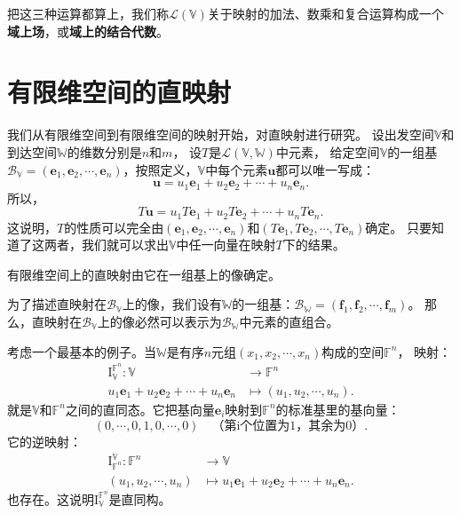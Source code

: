 \documentclass[12pt,UTF8,fontset=none]{ctexbook}
\begin{document}
把这三种运算都算上，我们称$\mathcal{L}(\mathbb{V})$关于映射的加法、数乘和复合运算构成一个\textbf{域上场}，或\textbf{域上的结合代数}。

\section{有限维空间的直映射}
我们从有限维空间到有限维空间的映射开始，对直映射进行研究。
设出发空间$\mathbb{V}$和到达空间$\mathbb{W}$的维数分别是$n$和$m$，
设$T$是$\mathcal{L}(\mathbb{V}, \mathbb{W})$中元素，
给定空间$\mathbb{V}$的一组基$\mathcal{B}_{\mathbb{V}} = (\mathbf{e}_1,\mathbf{e}_2,\cdots,\mathbf{e}_n)$，按照定义，$\mathbb{V}$中每个元素$\mathbf{u}$都可以唯一写成：
$$ \mathbf{u} = u_1\mathbf{e}_1+u_2\mathbf{e}_2+\cdots+u_n\mathbf{e}_n.$$
所以，
$$T\mathbf{u} = u_1T\mathbf{e}_1+u_2T\mathbf{e}_2+\cdots+u_nT\mathbf{e}_n.$$
这说明，$T$的性质可以完全由$(\mathbf{e}_1,\mathbf{e}_2,\cdots,\mathbf{e}_n)$和$(T\mathbf{e}_1,T\mathbf{e}_2,\cdots,T\mathbf{e}_n)$确定。
只要知道了这两者，我们就可以求出$\mathbb{V}$中任一向量在映射$T$下的结果。

\begin{pp}\label{pp:3_0}
    有限维空间上的直映射由它在一组基上的像确定。
\end{pp}

为了描述直映射在$\mathcal{B}_{\mathbb{V}}$上的像，我们设有$\mathbb{W}$的一组基：$\mathcal{B}_{\mathbb{W}} = (\mathbf{f}_1,\mathbf{f}_2,\cdots,\mathbf{f}_m)$。
那么，直映射在$\mathcal{B}_{\mathbb{V}}$上的像必然可以表示为$\mathcal{B}_{\mathbb{W}}$中元素的直组合。

考虑一个最基本的例子。当$\mathbb{W}$是有序$n$元组$(x_1, x_2, \cdots, x_n)$构成的空间$\mathbb{F}^n$，
映射：
\begin{align*}
    \mathrm{I}_{\mathbb{V}}^{\mathbb{F}^n} : \mathbb{V} &\rightarrow \mathbb{F}^n  \\
    u_1\mathbf{e}_1+u_2\mathbf{e}_2+\cdots+u_n\mathbf{e}_n &\mapsto (u_1, u_2, \cdots , u_n). 
\end{align*}
就是$\mathbb{V}$和$\mathbb{F}^n$之间的直同态。它把基向量$\mathbf{e}_i$映射到$\mathbb{F}^n$的标准基里的基向量：
$$ (0, \cdots, 0, 1, 0, \cdots, 0)\quad\mbox{（第i个位置为1，其余为0）}.$$
它的逆映射：
\begin{align*}
    \mathrm{I}_{\mathbb{F}^n}^{\mathbb{V}} : \mathbb{F}^n &\rightarrow \mathbb{V}  \\
    (u_1, u_2, \cdots , u_n) &\mapsto u_1\mathbf{e}_1+u_2\mathbf{e}_2+\cdots+u_n\mathbf{e}_n. 
\end{align*}
也存在。这说明$\mathrm{I}_{\mathbb{V}}^{\mathbb{F}^n}$是直同构。
\end{document}
